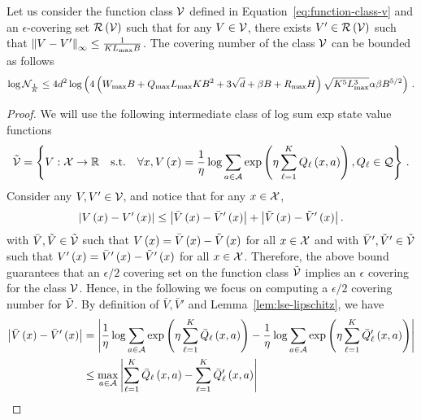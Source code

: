 \begin{lemma} \label{lem:covering-number-v}
    Let us consider the function class $\mathcal{V}$ defined in Equation~\eqref{eq:function-class-v} and an $\epsilon$-covering set $\mathcal{R} \left( \mathcal{V} \right)$ such that for any $V \in \mathcal{V}$, there exists $V' \in \mathcal{R} \left( \mathcal{V} \right)$ such that $\left\|V - V'\right\|_\infty \leq \frac{1}{K L_{\max} B}$. The covering number of the class $\mathcal{V}$ can be bounded as follows
    \begin{equation*}
        \log \mathcal{N}_{\frac1K} \leq 4 d^2 \log \left( 4 \left( W_{\max} B + Q_{\max} L_{\max} K B^2 + 3 \sqrt{d} + \beta B + R_{\max} H \right) \sqrt{K^5 L_{\max}^3} \alpha \beta B^{5/2} \right)\,.
    \end{equation*}
\end{lemma}

\begin{proof}
    We will use the following intermediate class of log sum exp state value functions
    \begin{equation*}
        \tilde{\mathcal{V}} = \left\{ V: \mathcal{X} \rightarrow \mathbb{R} \quad\text{s.t.}\quad \forall x, V \left( x \right) = \frac1\eta \log \sum_{a \in \mathcal{A}}\exp \left( \eta \sum_{\ell=1}^K Q_\ell \left( x, a \right) \right), Q_\ell \in \mathcal{Q} \right\}\,.
    \end{equation*}
    Consider any $V, V' \in \mathcal{V}$, and notice that for any $x \in \mathcal{X}$,
    \begin{equation*}
        \left|V \left( x \right) - V' \left( x \right)\right| \leq \left|\bar{V} \left( x \right) - \bar{V}' \left( x \right)\right| + \left|\tilde{V} \left( x \right) - \tilde{V}' \left( x \right)\right|.
    \end{equation*}
    with $\bar{V}, \tilde{V} \in \tilde{\mathcal{V}}$ such that $V \left( x \right) = \bar{V} \left( x \right) - \tilde{V} \left( x \right)$ for all $x \in \mathcal{X}$ and with $\bar{V}', \tilde{V}' \in \tilde{\mathcal{V}}$ such that $V' \left( x \right) = \bar{V}' \left( x \right) - \tilde{V}' \left( x \right)$ for all $x \in \mathcal{X}$. Therefore, the above bound guarantees that an $\epsilon / 2$ covering set on the function class $\tilde{\mathcal{V}}$ implies an $\epsilon$ covering for the class $\mathcal{V}$. Hence, in the following we focus on computing a $\epsilon / 2$ covering number for $\tilde{\mathcal{V}}$. By definition of $\bar{V}, \bar{V}'$ and Lemma~\ref{lem:lse-lipschitz}, we have
    \begin{align*}
        \abs{\bar{V} \spr{x} - \bar{V}' \spr{x}} &= \abs{\frac1\eta \log \sum_{a \in \cA} \exp \brr{\eta \sum^K_{\ell=1} \bar{Q}_\ell \spr{x, a}} - \frac1\eta \log \sum_{a \in \cA} \exp \spr{\eta \sum^K_{\ell=1} \bar{Q}_\ell' \spr{x, a}}} \\
        &\leq \max_{a \in \A} \abs{ \sum^K_{\ell=1} \bar{Q}_\ell \spr{x, a} -  \sum^K_{\ell=1} \bar{Q}'_\ell \spr{x, a}} \\

\end{align*}
\end{proof}
